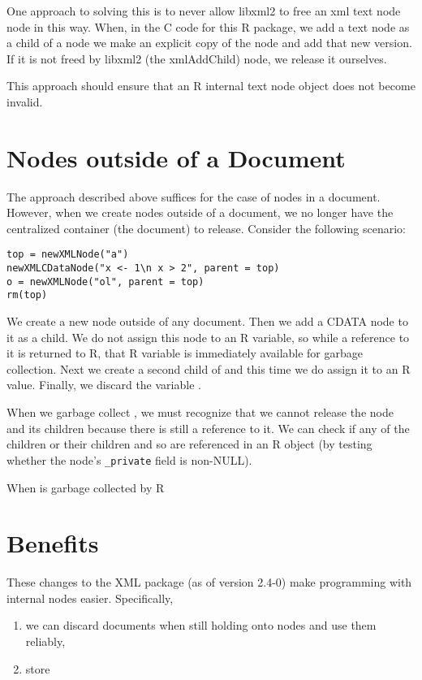 \documentclass{article}
\def\Rvar#{\textsl{#1}}
\begin{document}
One approach to solving this is to never allow libxml2 to free an xml
text node node in this way.  When, in the C code for this R package,
we add a text node as a child of a node we make an explicit copy of
the node and add that new version.  If it is not freed by libxml2 (the
xmlAddChild) node, we release it ourselves.

This approach should ensure that an R internal text node object
does not become invalid.

\section{Nodes outside of a Document}
The approach described above suffices for the case of nodes in a
document.  However, when we create nodes outside of a document, we no
longer have the centralized container (the document) to release.
Consider the following scenario:
\begin{verbatim}
top = newXMLNode("a")
newXMLCDataNode("x <- 1\n x > 2", parent = top)
o = newXMLNode("ol", parent = top)
rm(top)
\end{verbatim}
We create a new node outside of any document.  Then we add a CDATA
node to it as a child.  We do not assign this node to an R variable,
so while a reference to it is returned to R, that R variable is
immediately available for garbage collection.  Next we create a second
child of  and this time we do assign it to an R value.
Finally, we discard the variable .

When we garbage collect , we must recognize that we cannot
release the node and its children because there is still a reference
to it.  We can check if any of the children or their children and so 
are referenced in an R object (by testing whether the node's
\verb+_private+ field is non-NULL).

When  is garbage collected by R


\section{Benefits}
These changes to the XML package (as of version 2.4-0)
make programming with internal nodes easier.
Specifically,
\begin{enumerate}
\item  we can discard documents when still holding onto nodes and  use
  them reliably,
\item store
\end{enumerate}
\end{document}
